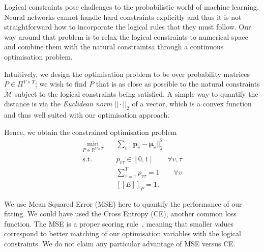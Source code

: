 \documentclass[acmsmall, review, anonymous]{acmart}\settopmatter{printfolios=true,printccs=false,printacmref=false}
\newcommand{\qqpi}[2]{[\![#2]\!]_{#1}}
\newcommand{\margincomment}[2]{\marginpar{\scriptsize\color{Maroon}#1 says: #2}}
\newcommand{\cas}[1]{\margincomment{Charles}{#1}}
\begin{document}
Logical constraints pose challenges to the probabilistic world of
machine learning.  Neural networks cannot handle hard constraints explicitly and 
thus it is not straightforward how to incorporate the logical rules that they must follow.
Our way around that problem is to relax the logical constraints to numerical
space and combine them with the natural constraintsa through a continuous
optimisation problem.

Intuitively, we design the optimisation problem to be over
probability matrices $P \in \Pi^{V \times T}$; we wish to find
$P$ that is as close as possible to the natural constraints $\mathcal{M}$
subject to the logical constraints being satisfied.
A simple way to quantify the distance is via the \emph{Euclidean norm} $|| \cdot ||_2$ of a vector,  which is a convex function and thus well suited with our optimisation approach.

%
%
Hence, we obtain the constrained optimisation problem
\begin{equation}
	\begin{aligned}\label{eq:opt_naive}
		\textstyle\underset{P \in \mathbb{R}^{V \times T}}{\mathrm{min}} & \quad
		\sum_v || \bm{p}_v - \bm{\mu}_v ||_2^2                                                                  \\
		\text{s.t. } & \quad
		p_{v\tau} \in [0, 1] \qquad \forall v, \tau    \\
		                                                       & \quad \sum_{\tau=1}^T p_{v\tau} = 1 \qquad \forall v \\
		                                                       & \quad \qqpi{P}{E} = 1.
	\end{aligned}
\end{equation}

We use Mean Squared Error (MSE) here to quantify the performance of our fitting.
We could have used the Cross Entropy (CE), another common loss function.  The
MSE is a proper scoring rule~\cite{gneiting07}, meaning that smaller values
correspond to better matching of our optimisation variables with the logical
constraints.  We do not claim any particular advantage of MSE versus CE.
\end{document}
